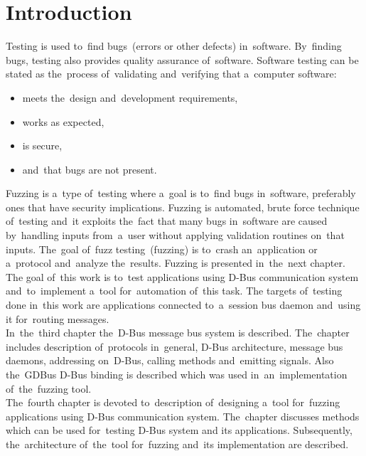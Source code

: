 

\chapter{Introduction}
Testing is used to~find bugs~(errors or other defects) in~software. By~finding bugs,
testing also provides quality assurance of~software. Software testing can be stated
as the~process of~validating and~verifying that a~computer software:
\begin{itemize}
	\item meets the~design and~development requirements,
	\item works as expected,
	\item is secure,
	\item and~that bugs are not present.
\end{itemize}

Fuzzing is a~type of~testing where a~goal is to~find bugs in~software, preferably
ones that have security implications. Fuzzing is automated, brute force technique
of~testing and~it exploits the~fact that many bugs in~software are caused
by~handling inputs from~a~user without applying validation routines on~that
inputs. The~goal of~fuzz testing~(fuzzing) is to~crash an~application or a~protocol
and~analyze the~results. Fuzzing is presented in~the~next chapter.\\

The goal of~this work is to~test applications using \mbox{D-Bus} communication
system and~to~implement a~tool for~automation of~this task. The targets of~testing
done in~this work are applications connected to~a~session bus daemon and~using it
for~routing messages.\\

In~the~third chapter the~D-Bus message bus system is described. The~chapter includes
description of~protocols in~general, D-Bus architecture, message bus daemons,
addressing on~D-Bus, calling methods and~emitting signals. Also the~GDBus \mbox{D-Bus}
binding is described which was used in~an~implementation of~the~fuzzing tool.\\

The~fourth chapter is devoted to~description of~designing a~tool for~fuzzing
applications using D-Bus communication system. The~chapter discusses methods
which can be used for~testing D-Bus system and its applications. Subsequently,
the~architecture of~the~tool for~fuzzing and~its implementation are described.\\

